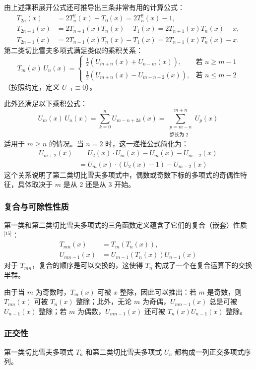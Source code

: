 由上述乘积展开公式还可推导出三条非常有用的计算公式：
$$
\begin{aligned}
T_{2n}(x) &= 2T_n^2(x) - T_0(x) = 2T_n^2(x) - 1, \\
T_{2n+1}(x) &= 2T_{n+1}(x) T_n(x) - T_1(x) = 2T_{n+1}(x) T_n(x) - x, \\
T_{2n-1}(x) &= 2T_{n-1}(x) T_n(x) - T_1(x) = 2T_{n-1}(x) T_n(x) - x.
\end{aligned}~
$$
第二类切比雪夫多项式满足类似的乘积关系：
$$
T_m(x)\, U_n(x) =
\begin{cases}
\frac{1}{2} \left( U_{m+n}(x) + U_{n - m}(x) \right), & \text{若 } n \geq m - 1 \\
\frac{1}{2} \left( U_{m+n}(x) - U_{m - n - 2}(x) \right), & \text{若 } n \leq m - 2
\end{cases}~
$$
（按照约定，定义 $U_{-1} \equiv 0$）。

此外还满足以下乘积公式：
$$
U_m(x)\, U_n(x) = \sum_{k = 0}^{n} U_{m - n + 2k}(x) = \sum_{\substack{p = m - n \\ \text{步长为 2}}}^{m + n} U_p(x)~
$$
适用于 $m \geq n$ 的情况。当 $n = 2$ 时，这一递推公式简化为：
$$
\begin{aligned}
U_{m+2}(x)
&= U_2(x) \cdot U_m(x) - U_m(x) - U_{m-2}(x) \\
&= U_m(x) \cdot \left( U_2(x) - 1 \right) - U_{m-2}(x)
\end{aligned}~
$$
这个关系说明了第二类切比雪夫多项式中，偶数或奇数下标的多项式的奇偶性特征，具体取决于 $m$ 是从 2 还是从 3 开始。
\subsubsection{复合与可除性性质}
第一类和第二类切比雪夫多项式的三角函数定义蕴含了它们的复合（嵌套）性质\(^\text{[15]}\)：
$$
\begin{aligned}
T_{mn}(x) &= T_m(T_n(x)), \\
U_{mn - 1}(x) &= U_{m - 1}(T_n(x))U_{n - 1}(x)
\end{aligned}~
$$
对于 $T_{mn}$，复合的顺序是可以交换的，这使得 $T_n$ 构成了一个在复合运算下的交换半群。

由于当 $m$ 为奇数时，$T_m(x)$ 可被 $x$ 整除，因此可以推出：若 $m$ 是奇数，则 $T_{mn}(x)$ 可被 $T_n(x)$ 整除；此外，无论 $m$ 为奇偶，$U_{mn - 1}(x)$ 总是可被 $U_{n - 1}(x)$ 整除；若 $m$ 为偶数，$U_{mn - 1}(x)$ 还可被 $T_n(x) U_{n - 1}(x)$ 整除。
\subsubsection{正交性}
第一类切比雪夫多项式 $T_n$ 和第二类切比雪夫多项式 $U_n$ 都构成一列正交多项式序列。

